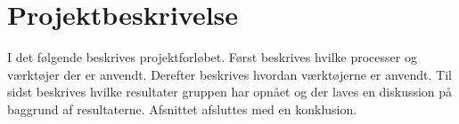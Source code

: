 \chapter{Projektbeskrivelse}
I det følgende beskrives projektforløbet. Først beskrives hvilke processer og værktøjer der er anvendt. Derefter beskrives hvordan værktøjerne er anvendt. Til sidst beskrives hvilke resultater gruppen har opnået og der laves en diskussion på baggrund af resultaterne. Afsnittet afsluttes med en konklusion.



\newpage


\newpage


\newpage


\newpage


\newpage
%

\newpage


\newpage

